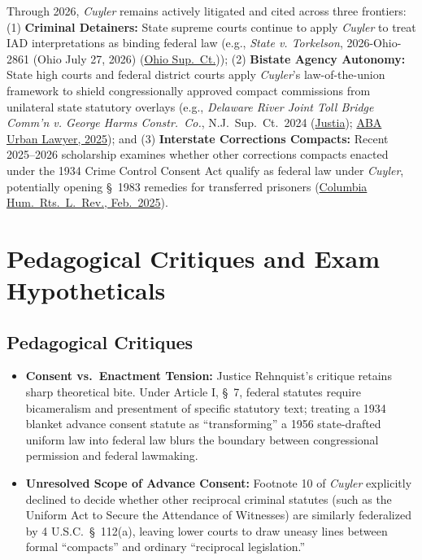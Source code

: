 \documentclass[12pt]{article}
\begin{document}
Through 2026, \textit{Cuyler} remains actively litigated and cited across three frontiers: (1) \textbf{Criminal Detainers:} State supreme courts continue to apply \textit{Cuyler} to treat IAD interpretations as binding federal law (e.g., \textit{State v. Torkelson}, 2026-Ohio-2861 (Ohio July 27, 2026) (\href{https://www.supremecourt.ohio.gov/rod/docs/pdf/12/2026/2026-Ohio-2861.pdf}{Ohio Sup.\ Ct.})); (2) \textbf{Bistate Agency Autonomy:} State high courts and federal district courts apply \textit{Cuyler}'s law-of-the-union framework to shield congressionally approved compact commissions from unilateral state statutory overlays (e.g., \textit{Delaware River Joint Toll Bridge Comm'n v. George Harms Constr.\ Co.}, N.J.\ Sup.\ Ct.\ 2024 (\href{https://law.justia.com/cases/new-jersey/supreme-court/2024/a-55-22.html}{Justia}); \href{https://www.americanbar.org/groups/state_local_government/resources/urban-lawyer/53-2/developments-interstate-compact-law-practice-2024/}{ABA Urban Lawyer, 2025}); and (3) \textbf{Interstate Corrections Compacts:} Recent 2025--2026 scholarship examines whether other corrections compacts enacted under the 1934 Crime Control Consent Act qualify as federal law under \textit{Cuyler}, potentially opening \S\ 1983 remedies for transferred prisoners (\href{https://hrlr.law.columbia.edu/files/2025/02/Barbosa_Far-from-Home_Final-Upload.pdf}{Columbia Hum.\ Rts.\ L.\ Rev., Feb.\ 2025}).

\section{Pedagogical Critiques and Exam Hypotheticals}

\subsection{Pedagogical Critiques}
\begin{itemize}
  \item \textbf{Consent vs.\ Enactment Tension:} Justice Rehnquist's critique retains sharp theoretical bite. Under Article I, \S\ 7, federal statutes require bicameralism and presentment of specific statutory text; treating a 1934 blanket advance consent statute as ``transforming'' a 1956 state-drafted uniform law into federal law blurs the boundary between congressional permission and federal lawmaking.
  \item \textbf{Unresolved Scope of Advance Consent:} Footnote 10 of \textit{Cuyler} explicitly declined to decide whether other reciprocal criminal statutes (such as the Uniform Act to Secure the Attendance of Witnesses) are similarly federalized by 4 U.S.C.\ \S\ 112(a), leaving lower courts to draw uneasy lines between formal ``compacts'' and ordinary ``reciprocal legislation.''
\end{itemize}
\end{document}
